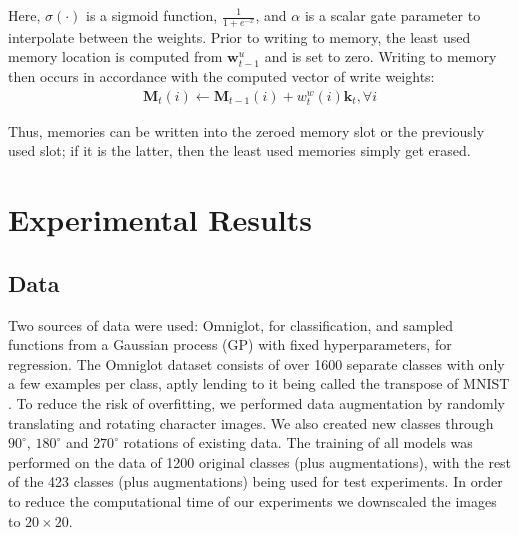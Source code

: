\documentclass{article}
\begin{document}
Here, $\sigma(\cdot)$ is a sigmoid function, $\frac{1}{1+e^{-x}}$, and $\alpha$ is a scalar gate parameter to interpolate between the weights. Prior to writing to memory, the least used memory location is computed from $\mathbf{w}_{t-1}^u$ and is set to zero. Writing to memory then occurs in accordance with the computed vector of write weights:
\begin{align}
    \mathbf{M}_t(i) \leftarrow \mathbf{M}_{t-1}(i) + w_t^{w}(i) \mathbf{k}_{t}, \forall i
\end{align}

Thus, memories can be written into the zeroed memory slot or the previously used slot; if it is the latter, then the least used memories simply get erased. 


\section{Experimental Results}

\subsection{Data}
Two sources of data were used: Omniglot, for classification, and sampled functions from a Gaussian process (GP) with fixed hyperparameters, for regression. The Omniglot dataset consists of over 1600 separate classes with only a few examples per class, aptly lending to it being called the transpose of MNIST \cite{lake2015human}. To reduce the risk of overfitting, we performed data augmentation by randomly translating and rotating character images. We also created new classes through $90^{\circ}$, $180^{\circ}$ and $270^{\circ}$ rotations of existing data. The training of all models was performed on the data of 1200 original classes (plus augmentations), with the rest of the 423 classes (plus augmentations) being used for test experiments. In order to reduce the computational time of our experiments we downscaled the images to $20\times20$.
\end{document}
